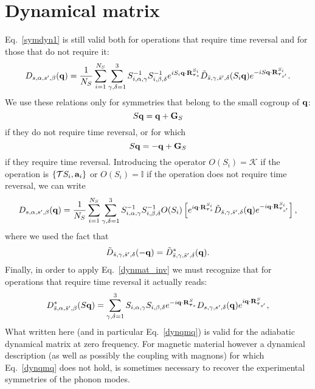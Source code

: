 \documentclass[12pt,a4paper,twoside]{report}
\begin{document}
\section{Dynamical matrix}
Eq.~\ref{symdyn1} is still valid both for
operations that require time reversal and for
those that do not require it:
\begin{equation}
D_{s,\alpha,s',\beta}({\bf q}) ={1\over N_S}
\sum_{i=1}^{N_S}
\sum_{\gamma,\delta=1}^3  S^{-1}_{i,\alpha,\gamma} S^{-1}_{i,\beta,\delta}
e^{i S_i {\bf q} \cdot {\bf R}^{S_i}_{\boldsymbol{\tau}_s} }
\tilde D_{\bar s,\gamma,\bar s',\delta}(S_i{\bf q})
e^{-i S{\bf q} \cdot {\bf R}^{S_i}_{\boldsymbol{\tau}_{s'}}}.
\label{symdyn1_again}
\end{equation}
We use these relations only for symmetries that belong to the small cogroup of 
${\bf q}$:
\begin{equation}
S{\bf q} = {\bf q} + {\bf G}_S
\end{equation}
if they do not require time reversal, or for which
\begin{equation}
S{\bf q} = -{\bf q} + {\bf G}_S
\end{equation}
if they require time reversal. Introducing the operator $O(S_i)=\mathcal{K}$ if the operation is $\{\mathcal{T}S_i,{\bf a}_i\}$
or $O(S_i)=\mathbb{I}$ if the operation
does not require time reversal, we can write
\begin{equation}
D_{s,\alpha,s',\beta}({\bf q}) ={1\over N_S}
\sum_{i=1}^{N_S}
\sum_{\gamma,\delta=1}^3  S^{-1}_{i,\alpha,\gamma} S^{-1}_{i,\beta,\delta} O(S_i)\left[
e^{i {\bf q} \cdot {\bf R}^{S_i}_{\boldsymbol{\tau}_s} }
\tilde D_{\bar s,\gamma,\bar s',\delta}({\bf q})
e^{-i {\bf q} \cdot {\bf R}^{S_i}_{\boldsymbol{\tau}_{s'}}}\right],
\label{symdyn1_again1}
\end{equation}
where we used the fact that
\begin{equation}
\tilde D_{\bar s,\gamma,\bar s',\delta}(-{\bf q})= \tilde D_{\bar s,\gamma,\bar s',\delta}^*({\bf q}).
\label{dynqmq}
\end{equation}
Finally, in order to apply Eq.~\ref{dynmat_inv} we must recognize that for operations that require time reversal it actually reads: 
\begin{equation}
D^*_{\bar s,\alpha,\bar s',\beta}(S{\bf q}) =
\sum_{\gamma,\delta=1}^3  S_{i,\alpha,\gamma} S_{i,\beta,\delta}
e^{-i {\bf q} \cdot {\bf R}^{S}_{\boldsymbol{\tau}_s} }
D_{s,\gamma,s',\delta}({\bf q})
e^{i {\bf q} \cdot {\bf R}^{S}_{\boldsymbol{\tau}_{s'}}},
\label{dynmat_inv_tr}
\end{equation}
What written here (and in particular  Eq.~\ref{dynqmq}) is valid for the adiabatic dynamical matrix at zero frequency. For magnetic material however a dynamical description (as well as possibly the coupling with magnons) for which Eq.~\ref{dynqmq} does not hold, is sometimes necessary to recover the experimental symmetries of the phonon modes. 
\end{document}
